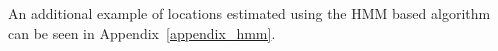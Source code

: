 An additional example of locations estimated using the HMM based algorithm can
be seen in Appendix~\ref{appendix_hmm}.

